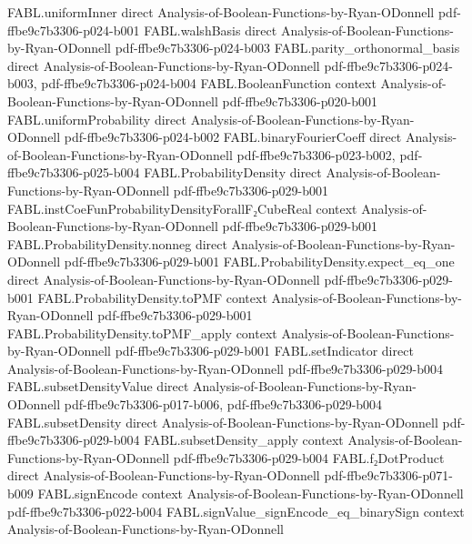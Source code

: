 \begin{theorem}
  {FABL.uniformInner}
  {direct}
  {Analysis-of-Boolean-Functions-by-Ryan-ODonnell}
  {pdf-ffbe9c7b3306-p024-b001}
\proofstep
  {FABL.walshBasis}
  {direct}
  {Analysis-of-Boolean-Functions-by-Ryan-ODonnell}
  {pdf-ffbe9c7b3306-p024-b003}
\proofstep
  {FABL.parity_orthonormal_basis}
  {direct}
  {Analysis-of-Boolean-Functions-by-Ryan-ODonnell}
  {pdf-ffbe9c7b3306-p024-b003,
    pdf-ffbe9c7b3306-p024-b004}
\proofstep
  {FABL.BooleanFunction}
  {context}
  {Analysis-of-Boolean-Functions-by-Ryan-ODonnell}
  {pdf-ffbe9c7b3306-p020-b001}
\proofstep
  {FABL.uniformProbability}
  {direct}
  {Analysis-of-Boolean-Functions-by-Ryan-ODonnell}
  {pdf-ffbe9c7b3306-p024-b002}
\proofstep
  {FABL.binaryFourierCoeff}
  {direct}
  {Analysis-of-Boolean-Functions-by-Ryan-ODonnell}
  {pdf-ffbe9c7b3306-p023-b002,
    pdf-ffbe9c7b3306-p025-b004}
\proofstep
  {FABL.ProbabilityDensity}
  {direct}
  {Analysis-of-Boolean-Functions-by-Ryan-ODonnell}
  {pdf-ffbe9c7b3306-p029-b001}
\proofstep
  {FABL.instCoeFunProbabilityDensityForallF₂CubeReal}
  {context}
  {Analysis-of-Boolean-Functions-by-Ryan-ODonnell}
  {pdf-ffbe9c7b3306-p029-b001}
\proofstep
  {FABL.ProbabilityDensity.nonneg}
  {direct}
  {Analysis-of-Boolean-Functions-by-Ryan-ODonnell}
  {pdf-ffbe9c7b3306-p029-b001}
\proofstep
  {FABL.ProbabilityDensity.expect_eq_one}
  {direct}
  {Analysis-of-Boolean-Functions-by-Ryan-ODonnell}
  {pdf-ffbe9c7b3306-p029-b001}
\proofstep
  {FABL.ProbabilityDensity.toPMF}
  {context}
  {Analysis-of-Boolean-Functions-by-Ryan-ODonnell}
  {pdf-ffbe9c7b3306-p029-b001}
\proofstep
  {FABL.ProbabilityDensity.toPMF_apply}
  {context}
  {Analysis-of-Boolean-Functions-by-Ryan-ODonnell}
  {pdf-ffbe9c7b3306-p029-b001}
\proofstep
  {FABL.setIndicator}
  {direct}
  {Analysis-of-Boolean-Functions-by-Ryan-ODonnell}
  {pdf-ffbe9c7b3306-p029-b004}
\proofstep
  {FABL.subsetDensityValue}
  {direct}
  {Analysis-of-Boolean-Functions-by-Ryan-ODonnell}
  {pdf-ffbe9c7b3306-p017-b006,
    pdf-ffbe9c7b3306-p029-b004}
\proofstep
  {FABL.subsetDensity}
  {direct}
  {Analysis-of-Boolean-Functions-by-Ryan-ODonnell}
  {pdf-ffbe9c7b3306-p029-b004}
\proofstep
  {FABL.subsetDensity_apply}
  {context}
  {Analysis-of-Boolean-Functions-by-Ryan-ODonnell}
  {pdf-ffbe9c7b3306-p029-b004}
\proofstep
  {FABL.f₂DotProduct}
  {direct}
  {Analysis-of-Boolean-Functions-by-Ryan-ODonnell}
  {pdf-ffbe9c7b3306-p071-b009}
\proofstep
  {FABL.signEncode}
  {context}
  {Analysis-of-Boolean-Functions-by-Ryan-ODonnell}
  {pdf-ffbe9c7b3306-p022-b004}
\proofstep
  {FABL.signValue_signEncode_eq_binarySign}
  {context}
  {Analysis-of-Boolean-Functions-by-Ryan-ODonnell}

\end{theorem}
